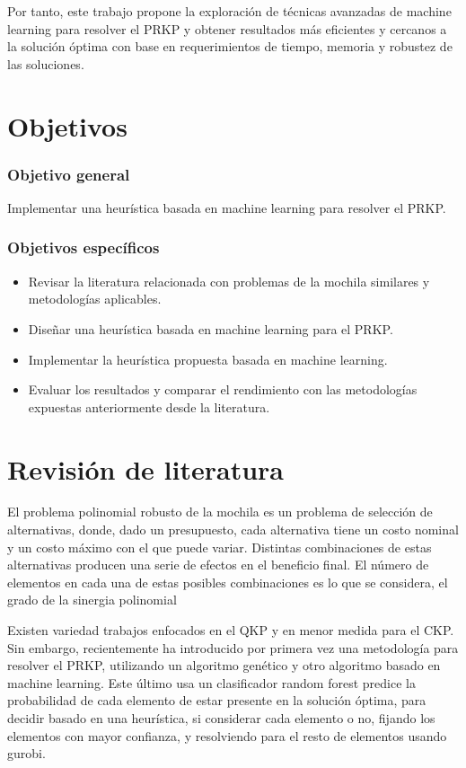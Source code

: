 \documentclass[spanish, a4paper, 12pt, twoside, openany,final]{book}
\numberwithin{equation}{section}                %
\begin{document}
Por tanto, este trabajo propone la exploración de técnicas avanzadas de machine learning para resolver el PRKP y obtener resultados más eficientes y cercanos a la solución óptima con base en requerimientos de tiempo, memoria y robustez de las soluciones.

\section{Objetivos}
\subsubsection{Objetivo general}
Implementar una heurística basada en machine learning para resolver el PRKP.
\subsubsection{Objetivos específicos}
\begin{itemize}
	\item Revisar la literatura relacionada con problemas de la mochila similares y metodologías aplicables.
	\item Diseñar una heurística basada en machine learning para el PRKP.
	\item Implementar la heurística propuesta basada en machine learning.
	\item Evaluar los resultados y comparar el rendimiento con las metodologías expuestas anteriormente desde la literatura.
\end{itemize}

\section{Revisión de literatura}
El problema polinomial robusto de la mochila es un problema de selección de alternativas, donde, dado un presupuesto, cada alternativa tiene un costo nominal y un costo máximo con el que puede variar. Distintas combinaciones de estas alternativas producen una serie de efectos en el beneficio final. El número de elementos en cada una de estas posibles combinaciones es lo que se considera, el grado de la sinergia polinomial

Existen variedad trabajos enfocados en el QKP y en menor medida para el CKP. Sin embargo, recientemente \cite{baldo_polynomial_2023} ha introducido por primera vez una metodología para resolver el PRKP, utilizando un algoritmo genético y otro algoritmo basado en machine learning. Este último usa un clasificador random forest predice la probabilidad de cada elemento de estar presente en la solución óptima, para decidir basado en una heurística, si considerar cada elemento o no, fijando los elementos con mayor confianza, y resolviendo para el resto de elementos usando gurobi.
\end{document}
